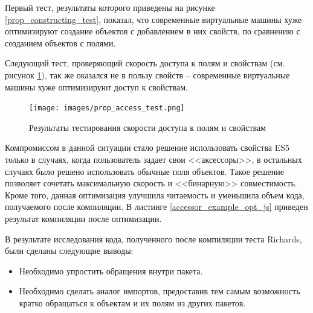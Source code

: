 Первый тест, результаты которого приведены на рисунке \ref{prop_constructing_test}, показал, что современные виртуальные машины хуже оптимизируют создание объектов с добавлением в них свойств, по сравнению с созданием объектов с полями.

Следующий тест, проверяющий скорость доступа к полям и свойствам (см. рисунок \ref{prop_access_test}), так же оказался не в пользу свойств -- современные виртуальные машины хуже оптимизируют доступ к свойствам.

\begin{figure}[ht!]
\centering
\texttt{[image: images/prop\_access\_test.png]}
\caption{Результаты тестирования скорости доступа к полям и свойствам}
\label{prop_access_test}
\end{figure}

Компромиссом в данной ситуации стало решение использовать свойства ES5 только в случаях, когда пользователь задает свои <<аксессоры>>, в остальных случаях было решено использовать обычные поля объектов. Такое решение позволяет сочетать максимальную скорость и <<бинарную>> совместимость. Кроме того, данная оптимизация улучшила читаемость и уменьшила объем кода, получаемого после компиляции. В листинге \ref{accessor_example_opt_js} приведен результат компиляции после оптимизации.

\begin{code}
\end{code}

В результате исследования кода, полученного после компиляции теста Richards, были сделаны следующие выводы:
\begin{itemize}
\item Необходимо упростить обращения внутри пакета.
\item Необходимо сделать аналог импортов, предоставив тем самым возможность кратко обращаться к объектам и их полям из других пакетов.
\end{itemize}


